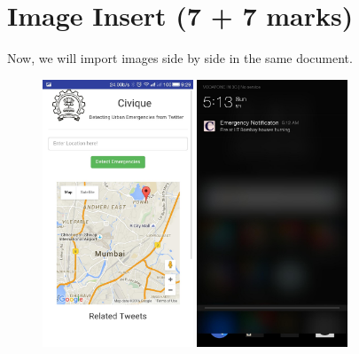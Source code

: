 \documentclass[12pt]{article}
\begin{document}
\section{Image Insert (7 + 7 marks)}
Now, we will import images side by side in the same document. \par
\begin{figure}[H]
\begin{floatrow}
{
  \includegraphics[width=0.4\textwidth]{./1.jpg}
}
{
  \includegraphics[width=0.4\textwidth]{./2.jpg}
}
\end{floatrow}
\end{figure}
\end{document}
